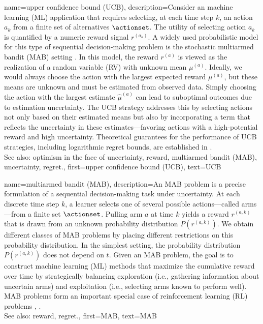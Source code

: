 {
{name={upper confidence bound (UCB)},
	description={Consider an machine learning (ML) 
		application that requires selecting, at each time step $k$, an action $a_{k}$ 
		from a finite set of alternatives $\actionset$. The utility of selecting action $a_{k}$ 
		is quantified by a numeric reward signal $r^{(a_{k})}$. 
		A widely used probabilistic model for this type of sequential decision-making problem 
		is the stochastic multiarmed bandit (MAB) setting \cite{Bubeck2012}. In this model, 
		the reward $r^{(a)}$ is viewed as the realization of a random variable (RV) 
		with unknown mean $\mu^{(a)}$. Ideally, we would always choose the 
		action with the largest expected reward $\mu^{(a)}$, but these 
		means are unknown and must be estimated from observed data. Simply 
		choosing the action with the largest estimate $\widehat{\mu}^{(a)}$ can 
		lead to suboptimal outcomes due to estimation uncertainty. The UCB strategy 
		addresses this by selecting actions not only based on their estimated means but 
		also by incorporating a term that reflects the uncertainty in these estimates—favoring 
		actions with a high-potential reward and high uncertainty. Theoretical guarantees 
		for the performance of UCB strategies, including logarithmic regret bounds, are established in \cite{Bubeck2012}.
					\\ 
		See also: optimism in the face of uncertainty, reward, multiarmed bandit (MAB), uncertainty, regret.},
	first={upper confidence bound (UCB)},
	text={UCB} 
}

{name={multiarmed bandit (MAB)},
	description={An MAB  problem is a precise 
	formulation of a sequential decision-making task under uncertainty. At each 
	discrete time step $k$, a learner selects one of several possible 
	actions—called arms—from a finite set $\actionset$. Pulling arm $a$ at time 
	$k$ yields a reward $r^{(a,k)}$ that is drawn from an unknown 
	probability distribution $P\left(r^{(a,k)}\right)$. We obtain different classes 
	of MAB problems by placing different restrictions on this probability distribution. In the simplest 
	setting, the probability distribution $P\left(r^{(a,k)}\right)$ does not depend on $t$. 
		Given an MAB problem, the goal is to construct machine learning (ML) methods that maximize the cumulative 
		reward over time by strategically balancing exploration (i.e., gathering information 
		about uncertain arms) and exploitation (i.e., selecting arms known to perform well). 
		MAB problems form an important special case of reinforcement learning (RL) problems \cite{Bubeck2012}, \cite{SuttonEd2}.
					\\ 
		See also: reward, regret.},
	first={MAB},
	text={MAB}
}



}
